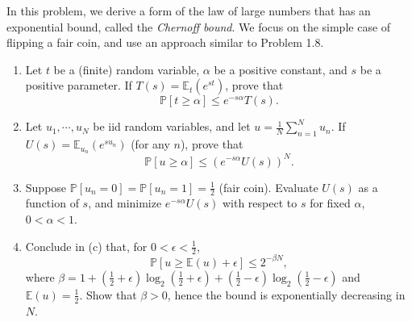 \documentclass{amsart}
\begin{document}
\begin{problem}[1.9]
  In this problem, we derive a form of the law of large numbers that has an
  exponential bound, called the \emph{Chernoff bound}. We focus on the simple
  case of flipping a fair coin, and use an approach similar to Problem 1.8.
  \begin{enumerate}
    \item Let \(t\) be a (finite) random variable, \(\alpha\) be a positive
      constant, and \(s\) be a positive parameter. If \(T(s) =
      \mathbb{E}_t(e^{st})\), prove that
      \begin{equation*}
        \mathbb{P}\left[t \geq \alpha\right] \leq e^{-s\alpha}T(s).
      \end{equation*}
    \item Let \(u_1, \cdots, u_N\) be iid random variables, and let
      \(u = \frac{1}{N}\sum_{n=1}^N u_n\). If \(U(s) =
      \mathbb{E}_{u_n}(e^{su_n})\) (for any \(n\)), prove that
      \begin{equation*}
        \mathbb{P}\left[u \geq \alpha\right] \leq
          \left(e^{-s\alpha}U(s)\right)^N.
      \end{equation*}
    \item Suppose \(\mathbb{P}\left[u_n=0\right] = \mathbb{P}\left[u_n=1\right]
      = \frac{1}{2}\) (fair coin). Evaluate \(U(s)\) as a function of \(s\), and
      minimize \(e^{-s\alpha}U(s)\) with respect to \(s\) for fixed \(\alpha\),
      \(0 < \alpha < 1\).
    \item Conclude in (c) that, for \(0 < \epsilon < \frac{1}{2}\),
      \begin{equation*}
        \mathbb{P}\left[u \geq \mathbb{E}(u) + \epsilon\right] \leq
          2^{-\beta N},
      \end{equation*}
      where \(\beta = 1 + \left(\frac{1}{2} + \epsilon\right)
        \log_2\left(\frac{1}{2} + \epsilon\right) +
        \left(\frac{1}{2} - \epsilon\right)
        \log_2\left(\frac{1}{2} - \epsilon\right)\)
      and \(\mathbb{E}(u) =
        \frac{1}{2}\).
      Show that \(\beta > 0\), hence the bound is exponentially decreasing in
      \(N\).
  \end{enumerate}
\end{problem}
\end{document}
